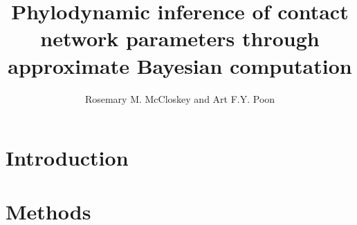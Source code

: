 \documentclass[12pt]{article}
\title{Phylodynamic inference of contact network parameters through approximate
Bayesian computation}
\author{Rosemary M. McCloskey and Art F.Y. Poon}
\begin{document}
\maketitle

\section{Introduction}


\section{Methods}


\printbibliography
\end{document}
